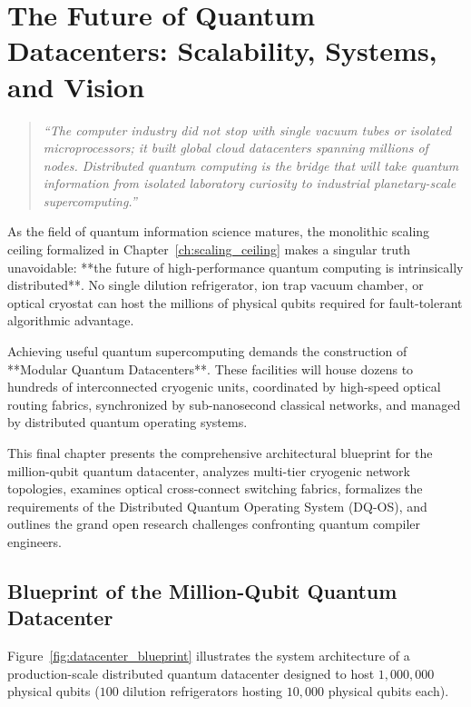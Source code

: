\chapter{The Future of Quantum Datacenters: Scalability, Systems, and Vision}
\label{ch:future_quantum_datacenters}

\begin{quote}
\textit{``The computer industry did not stop with single vacuum tubes or isolated microprocessors; it built global cloud datacenters spanning millions of nodes. Distributed quantum computing is the bridge that will take quantum information from isolated laboratory curiosity to industrial planetary-scale supercomputing.''}
\end{quote}

As the field of quantum information science matures, the monolithic scaling ceiling formalized in Chapter~\ref{ch:scaling_ceiling} makes a singular truth unavoidable: **the future of high-performance quantum computing is intrinsically distributed**. No single dilution refrigerator, ion trap vacuum chamber, or optical cryostat can host the millions of physical qubits required for fault-tolerant algorithmic advantage.

Achieving useful quantum supercomputing demands the construction of **Modular Quantum Datacenters**. These facilities will house dozens to hundreds of interconnected cryogenic units, coordinated by high-speed optical routing fabrics, synchronized by sub-nanosecond classical networks, and managed by distributed quantum operating systems. 

This final chapter presents the comprehensive architectural blueprint for the million-qubit quantum datacenter, analyzes multi-tier cryogenic network topologies, examines optical cross-connect switching fabrics, formalizes the requirements of the Distributed Quantum Operating System (DQ-OS), and outlines the grand open research challenges confronting quantum compiler engineers.

\section{Blueprint of the Million-Qubit Quantum Datacenter}
\label{sec:datacenter_blueprint}

Figure~\ref{fig:datacenter_blueprint} illustrates the system architecture of a production-scale distributed quantum datacenter designed to host $1,000,000$ physical qubits ($100$ dilution refrigerators hosting $10,000$ physical qubits each).

